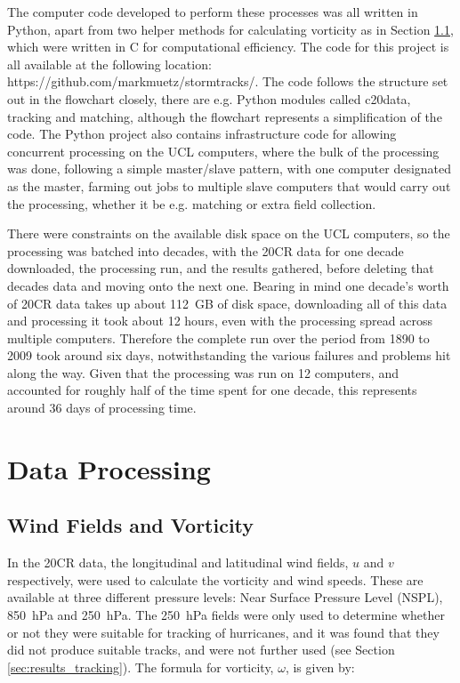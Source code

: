 \documentclass[pdftex,12pt,a4paper]{report}
\begin{document}
\newpage
The computer code developed to perform these processes was all written in Python, apart from two
helper methods for calculating vorticity as in Section \ref{sec:vort}, which were written in C for
computational efficiency. The code for this project is all available at the following location:
https://github.com/markmuetz/stormtracks/. The code follows the structure set out in the flowchart
closely, there are e.g. Python modules called c20data, tracking and matching, although the flowchart
represents a simplification of the code. The Python project also contains infrastructure code for
allowing concurrent processing on the UCL computers, where the bulk of the processing was done,
following a simple master/slave pattern, with one computer designated as the master, farming out
jobs to multiple slave computers that would carry out the processing, whether it be e.g. matching or
extra field collection. 

There were constraints on the available disk space on the UCL computers, so the
processing was batched into decades, with the 20CR data for one decade downloaded, the processing
run, and the results gathered, before deleting that decades data and moving onto the next one.
Bearing in mind one decade's worth of 20CR data takes up about \SI{112}{GB} of disk space,
downloading all of this data and processing it took about 12 hours, even with the processing spread
across multiple computers. Therefore the complete run over the period from 1890 to 2009 took around
six days, notwithstanding the various failures and problems hit along the way. Given that the
processing was run on 12 computers, and accounted for roughly half of the time spent for one decade,
this represents around 36 days of processing time.

\section{Data Processing}

\subsection{Wind Fields and Vorticity}
\label{sec:vort}

In the 20CR data, the longitudinal and latitudinal wind fields, $u$ and $v$ respectively, were used
to calculate the vorticity and wind speeds. These are available at three different pressure levels:
Near Surface Pressure Level (NSPL), \SI{850}{hPa} and \SI{250}{hPa}. The \SI{250}{hPa} fields were
only used to determine whether or not they were suitable for tracking of hurricanes, and it was
found that they did not produce suitable tracks, and were not further used (see Section
\ref{sec:results_tracking}). The formula for vorticity, $\omega$, is given by:
\end{document}

